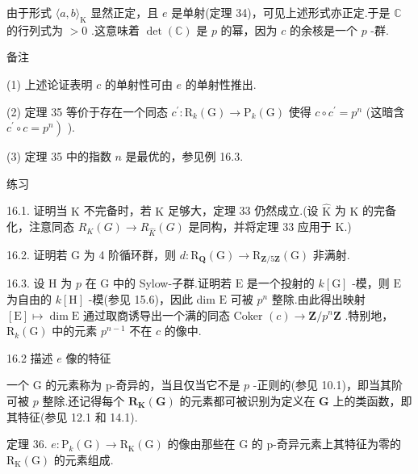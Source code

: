 \documentclass[10pt]{article}
\begin{document}
由于形式 \(\langle a,b{\rangle }_{\mathrm{K}}\) 显然正定，且 \(e\) 是单射(定理 34)，可见上述形式亦正定.于是 \(\mathbb{C}\) 的行列式为 \(> 0\) .这意味着 \(\det \left( \mathbb{C}\right)\) 是 \(p\) 的幂，因为 \(c\) 的余核是一个 \(p\) -群.

备注

(1) 上述论证表明 \(c\) 的单射性可由 \(e\) 的单射性推出.

(2) 定理 35 等价于存在一个同态 \({c}^{\prime } : {\mathrm{R}}_{k}\left( \mathrm{G}\right)  \rightarrow  {\mathrm{P}}_{k}\left( \mathrm{G}\right)\) 使得 \(c \circ  {c}^{\prime } = {p}^{n}\) (这暗含 \(\left. {{c}^{\prime } \circ  c = {p}^{n}}\right)\) ).

(3) 定理 35 中的指数 \(n\) 是最优的，参见例 16.3.

练习

16.1. 证明当 \(\mathrm{K}\) 不完备时，若 \(\mathrm{K}\) 足够大，定理 33 仍然成立.(设 \(\widehat{\mathrm{K}}\) 为 \(\mathrm{K}\) 的完备化，注意同态 \({R}_{K}\left( G\right)  \rightarrow  {R}_{\widehat{K}}\left( G\right)\) 是同构，并将定理 33 应用于 K.)

16.2. 证明若 \(\mathrm{G}\) 为 4 阶循环群，则 \(d : {\mathrm{R}}_{\mathbf{Q}}\left( \mathrm{G}\right)  \rightarrow  {\mathrm{R}}_{\mathbf{Z}/5\mathbf{Z}}\left( \mathrm{G}\right)\) 非满射.

16.3. 设 \(\mathrm{H}\) 为 \(p\) 在 \(\mathrm{G}\) 中的 Sylow-子群.证明若 \(\mathrm{E}\) 是一个投射的 \(k\left\lbrack  \mathrm{G}\right\rbrack\) -模，则 \(\mathrm{E}\) 为自由的 \(k\left\lbrack  \mathrm{H}\right\rbrack\) -模(参见 15.6)，因此 dim \(\mathrm{E}\) 可被 \({p}^{n}\) 整除.由此得出映射 \(\left\lbrack  \mathrm{E}\right\rbrack   \mapsto  \dim \mathrm{E}\) 通过取商诱导出一个满的同态 Coker \(\left( c\right)  \rightarrow  \mathbf{Z}/{p}^{n}\mathbf{Z}\) .特别地， \({\mathrm{R}}_{k}\left( \mathrm{G}\right)\) 中的元素 \({p}^{n - 1}\) 不在 \(c\) 的像中.

16.2 描述 \(e\) 像的特征

一个 \(\mathrm{G}\) 的元素称为 p-奇异的，当且仅当它不是 \(p\) -正则的(参见 10.1)，即当其阶可被 \(p\) 整除.还记得每个 \({\mathbf{R}}_{\mathbf{K}}\left( \mathbf{G}\right)\) 的元素都可被识别为定义在 \(\mathbf{G}\) 上的类函数，即其特征(参见 12.1 和 14.1).

定理 36. \(e : {\mathrm{P}}_{k}\left( \mathrm{G}\right)  \rightarrow  {\mathrm{R}}_{\mathrm{K}}\left( \mathrm{G}\right)\) 的像由那些在 \(\mathrm{G}\) 的 p-奇异元素上其特征为零的 \({\mathrm{R}}_{\mathrm{K}}\left( \mathrm{G}\right)\) 的元素组成.
\end{document}
